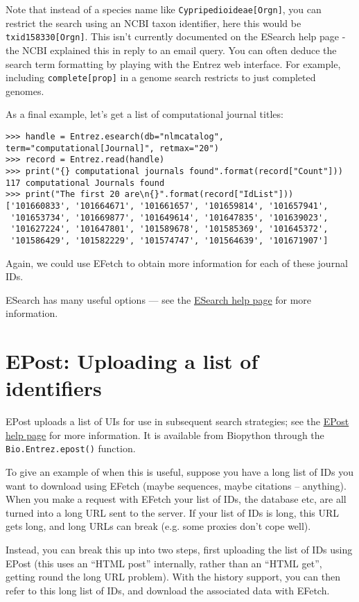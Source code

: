 Note that instead of a species name like \texttt{Cypripedioideae[Orgn]}, you can restrict the search using an NCBI taxon identifier, here this would be \texttt{txid158330[Orgn]}.  This isn't currently documented on the ESearch help page - the NCBI explained this in reply to an email query.  You can often deduce the search term formatting by playing with the Entrez web interface.  For example, including \texttt{complete[prop]} in a genome search restricts to just completed genomes.

As a final example, let's get a list of computational journal titles:
\begin{verbatim}
>>> handle = Entrez.esearch(db="nlmcatalog", term="computational[Journal]", retmax="20")
>>> record = Entrez.read(handle)
>>> print("{} computational journals found".format(record["Count"]))
117 computational Journals found
>>> print("The first 20 are\n{}".format(record["IdList"]))
['101660833', '101664671', '101661657', '101659814', '101657941',
 '101653734', '101669877', '101649614', '101647835', '101639023',
 '101627224', '101647801', '101589678', '101585369', '101645372',
 '101586429', '101582229', '101574747', '101564639', '101671907']
\end{verbatim}
Again, we could use EFetch to obtain more information for each of these journal IDs.

ESearch has many useful options --- see the \href{https://www.ncbi.nlm.nih.gov/books/NBK25499/#chapter4.ESearch}{ESearch help page} for more information.

\section{EPost: Uploading a list of identifiers}
EPost uploads a list of UIs for use in subsequent search strategies; see the
\href{https://www.ncbi.nlm.nih.gov/books/NBK25499/#chapter4.EPost}{EPost help page} for more information. It is available from Biopython through
the \verb+Bio.Entrez.epost()+ function.

To give an example of when this is useful, suppose you have a long list of IDs
you want to download using EFetch (maybe sequences, maybe citations --
anything). When you make a  request with EFetch your list of IDs, the database
etc, are all turned into a long URL sent to the server.  If your list of IDs is
long, this URL gets long, and long URLs can break (e.g. some proxies don't
cope well).

Instead, you can break this up into two steps, first uploading the list of IDs
using EPost (this uses an ``HTML post'' internally, rather than an ``HTML get'',
getting round the long URL problem).  With the history support, you can then
refer to this long list of IDs, and download the associated data with EFetch.

